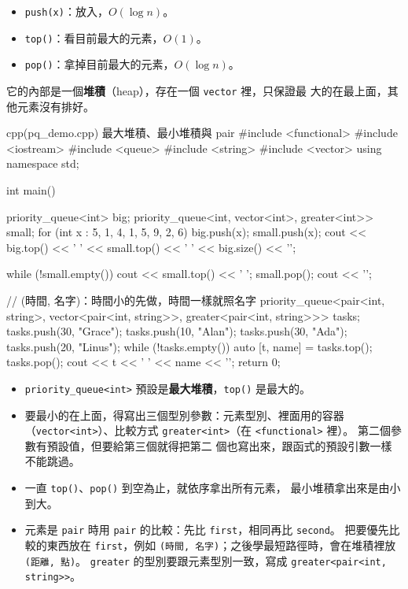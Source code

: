 \begin{itemize}
\item \texttt{push(x)}：放入，$O(\log n)$。
\item \texttt{top()}：看目前最大的元素，$O(1)$。
\item \texttt{pop()}：拿掉目前最大的元素，$O(\log n)$。
\end{itemize}

它的內部是一個\textbf{堆積}（heap），存在一個 \texttt{vector} 裡，只保證最
大的在最上面，其他元素沒有排好。

\begin{example}[label=ex:pq]{cpp}{(pq\_demo.cpp) 最大堆積、最小堆積與 pair}
#include <functional>
#include <iostream>
#include <queue>
#include <string>
#include <vector>
using namespace std;

int main() {
    priority_queue<int> big;
    priority_queue<int, vector<int>, greater<int>> small;
    for (int x : {5, 1, 4, 1, 5, 9, 2, 6}) {
        big.push(x);
        small.push(x);
    }
    cout << big.top() << ' ' << small.top() << ' ' << big.size() << '\n';

    while (!small.empty()) {
        cout << small.top() << ' ';
        small.pop();
    }
    cout << '\n';

    // (時間, 名字)：時間小的先做，時間一樣就照名字
    priority_queue<pair<int, string>, vector<pair<int, string>>,
                   greater<pair<int, string>>> tasks;
    tasks.push({30, "Grace"});
    tasks.push({10, "Alan"});
    tasks.push({30, "Ada"});
    tasks.push({20, "Linus"});
    while (!tasks.empty()) {
        auto [t, name] = tasks.top();
        tasks.pop();
        cout << t << ' ' << name << '\n';
    }
    return 0;
}
\end{example}


\begin{itemize}
\item \texttt{priority\_queue<int>} 預設是\textbf{最大堆積}，\texttt{top()}
是最大的。
\item 要最小的在上面，得寫出三個型別參數：元素型別、裡面用的容器
（\texttt{vector<int>}）、比較方式 \texttt{greater<int>}（在
\texttt{<functional>} 裡）。 第二個參數有預設值，但要給第三個就得把第二
個也寫出來，跟函式的預設引數一樣不能跳過。
\item 一直 \texttt{top()}、\texttt{pop()} 到空為止，就依序拿出所有元素，
最小堆積拿出來是由小到大。
\item 元素是 \texttt{pair} 時用 \texttt{pair} 的比較：先比
\texttt{first}，相同再比 \texttt{second}。 把要優先比較的東西放在
\texttt{first}，例如 \texttt{(時間, 名字)}；之後學最短路徑時，會在堆積裡放
\texttt{(距離, 點)}。 \texttt{greater} 的型別要跟元素型別一致，寫成
\texttt{greater<pair<int, string>>}。
\end{itemize}

